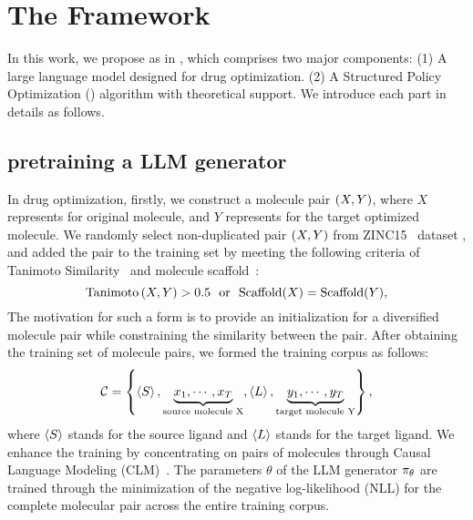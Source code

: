 


\section{The \fwname Framework} %
{In this work, we propose \fwname  as in , which}
comprises {two} major components: 
{(1) A large language model designed  for drug optimization.}
{(2) A Structured Policy Optimization (\algname)
{algorithm with theoretical support.}
} 
{We introduce each part in details as follows.}




\subsection{{pretraining a LLM generator}}\label{sec:pretrain}
In drug optimization, firstly, we construct a molecule pair $ \left( {X,Y} \right) $,
where $X$ represents for original molecule, and $Y$ represents for the target optimized molecule. We randomly select non-duplicated pair $ \left( {X,Y} \right) $ from ZINC15~\citep{sterling2015zinc} dataset , and added the pair to the training set by meeting the following criteria of Tanimoto Similarity~\citep{bajusz2015tanimoto} and molecule scaffold~\citep{landrum2013rdkit}:
\begin{equation}
\text{Tanimoto} \left( {X,Y} \right)  > 0.5 \text{~~or~~}\text{Scaffold}(X) = \text{Scaffold}(Y), \notag
\end{equation}
The motivation for such a form is to provide an initialization for a diversified molecule pair while constraining the similarity between the pair. After obtaining the training set of molecule pairs, we formed the training corpus as follows:
\begin{equation}\label{eq:corpus}
\mathcal{C}=\left\{
\left\langle S \right\rangle,\underbrace{x_1,\cdots,x_{T}}_{\text{source molecule X}},\left\langle L \right\rangle,\underbrace{y_1,\cdots,y_{T}}_{\text{target molecule Y}}
\right\},
\end{equation}
where $\left\langle S \right\rangle$ stands for the source ligand and $\left\langle L \right\rangle$ stands for the target ligand. 
We enhance the training by concentrating on pairs of molecules through Causal Language Modeling (CLM)~\citep{vaswani2017attention}.
The parameters $\theta$ of the LLM generator $\pi_{\theta}$ are trained through the minimization of the negative log-likelihood (NLL) for the complete molecular pair across the entire training corpus.
